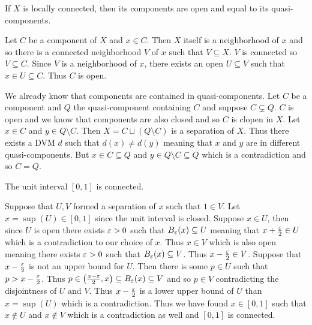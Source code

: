 \documentclass[letterpaper, 11pt]{article}
\begin{document}
\begin{exercise}
  If $X$ is locally connected, then its components are open and equal to its quasi-components.
\end{exercise}
\begin{pf}
  Let $C$ be a component of $X$ and $x \in C$.
  Then $X$ itself is a neighborhood of $x$ and so there is a connected neighborhood $V$ of $x$ such that $V \subseteq X$.
  $V$ is connected so $V \subseteq C$.
  Since $V$ is a neighborhood of $x$, there exists an open $U \subseteq V$ such that $x \in U \subseteq C$.
  Thus $C$ is open.

  We already know that components are contained in quasi-components.
  Let $C$ be a component and $Q$ the quasi-component containing $C$ and suppose $C \subsetneq Q$.
  $C$ is open and we know that components are also closed and so $C$ is clopen in $X$.
  Let $x \in C$ and $y \in Q \setminus C$.
  Then $X = C \sqcup (Q \setminus C)$ is a separation of $X$.
  Thus there exists a DVM $d$ such that $d(x) \neq d(y)$ meaning that $x$ and $y$ are in different quasi-components.
  But $x \in C \subseteq Q$ and $y \in Q \setminus C \subseteq Q$ which is a contradiction and so $C = Q$.
\end{pf}

\begin{exercise}\label{exercise:unit_interval_connected}
  The unit interval $[0, 1]$ is connected.
\end{exercise}
\begin{pf}
  Suppose that $U, V$ formed a separation of $x$ such that $1 \in V$.
  Let $x = \sup(U) \in [0, 1]$ since the unit interval is closed.
  Suppose $x \in U$, then since $U$ is open there exists $\varepsilon > 0$ such that $B_{\varepsilon}(x) \subseteq U$ meaning that $x + \frac{\varepsilon}{2} \in U$ which is a contradiction to our choice of $x$.
  Thus $x \in V$ which is also open meaning there exists $\varepsilon > 0$ such that $B_{\varepsilon}(x) \subseteq V$.
  Thus $x - \frac{\varepsilon}{2} \in V$.
  Suppose that $x - \frac{\varepsilon}{2}$ is not an upper bound for $U$.
  Then there is some $p \in U$ such that $p > x - \frac{\varepsilon}{2}$.
  Thus $p \in \pqty{\frac{x - \e}{2}, x} \subseteq B_{\e}(x) \subseteq V$ and so $p \in V$ contradicting the disjointness of $U$ and $V$.
  Thus $x - \frac{\varepsilon}{2}$ is a lower upper bound of $U$ than $x = \sup(U)$ which is a contradiction.
  Thus we have found $x \in [0, 1]$ such that $x \notin U$ and $x \notin V$ which is a contradiction as well and $[0, 1]$ is connected.
\end{pf}
\end{document}
